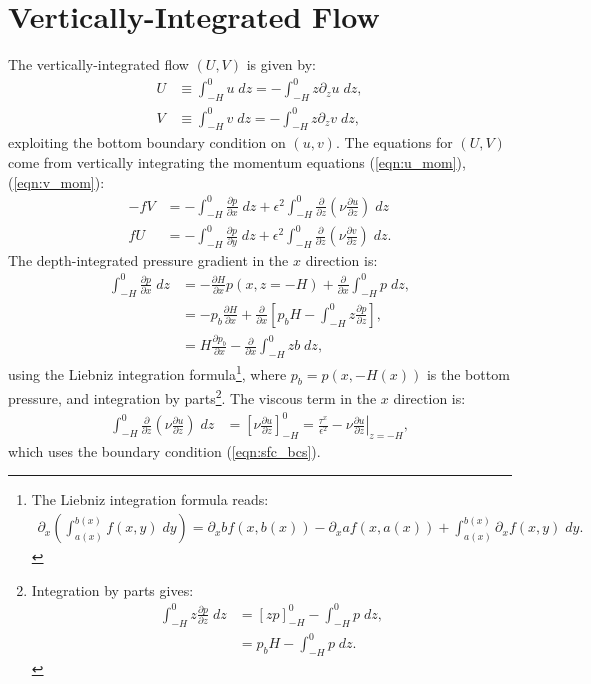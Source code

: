 \documentclass[10pt]{amsart}
\begin{document}
\section{Vertically-Integrated Flow}
The vertically-integrated flow $(U, V)$ is given by:
\begin{align}
U & \equiv \int_{-H}^{0} u \; dz = - \int_{-H}^0 z \partial_z u \; dz , \nonumber \\
V & \equiv \int_{-H}^{0} v \; dz = - \int_{-H}^0 z \partial_z v \; dz ,
\label{eqn:UV_defs}
\end{align}
exploiting the bottom boundary condition on $(u, v)$.
The equations for $(U, V)$ come from vertically integrating the momentum equations (\ref{eqn:u_mom}), (\ref{eqn:v_mom}):
\begin{align}
- f V & = -  \int_{-H}^{0} \frac{\partial p}{\partial x} \; dz + \epsilon^2   \int_{-H}^{0} \frac{\partial}{\partial z} \left( \nu \frac{\partial u}{\partial z} \right) \; dz \label{eqn:U_mom0} \\
f  U & = -  \int_{-H}^{0} \frac{\partial p}{\partial y} \; dz + \epsilon^2  \int_{-H}^{0} \frac{\partial}{\partial z} \left( \nu \frac{\partial v}{\partial z} \right) \; dz . \label{eqn:V_mom0}
\end{align}
The depth-integrated pressure gradient in the $x$ direction is:
\begin{align}
 \int_{-H}^{0} \frac{\partial p}{\partial x} \; dz & = - \frac{\partial H}{\partial x} p(x,z = -H) +  \frac{\partial }{\partial x} \int_{-H}^0 p \; dz , \\
 & = - p_b \frac{\partial H}{\partial x} + \frac{\partial }{\partial x} \left[ p_b H - \int_{-H}^0 z \frac{\partial p}{\partial z}  \right], \\
  & = H \frac{\partial p_b}{\partial x} - \frac{\partial }{\partial x} \int_{-H}^0 z b \; dz ,
 \end{align}
 using the Liebniz integration formula\footnote{The Liebniz integration formula reads:
 \begin{align}
 \partial_x \left( \int_{a(x)}^{b(x)} f(x,y) \; dy \right) = \partial_x b f(x,b(x)) - \partial_x a f(x,a(x)) +  \int_{a(x)}^{b(x)} \partial_x f(x, y) \; dy . \nonumber
 \end{align}
 }, where $p_b = p(x,-H(x))$ is the bottom pressure, and integration by parts\footnote{
 Integration by parts gives:
 \begin{align}
\int_{-H}^0 z \frac{\partial p}{\partial z} \; dz & = \left[ z p \right]_{-H}^0 -   \int_{-H}^0 p \; dz , \nonumber \\ 
& = p_b H -  \int_{-H}^0 p \; dz . \nonumber
 \end{align}
 }.
 The viscous term in the $x$ direction is:
 \begin{align}
  \int_{-H}^{0} \frac{\partial}{\partial z} \left( \nu \frac{\partial u}{\partial z} \right) \; dz & = \left[  \nu \frac{\partial u}{\partial z}  \right]_{-H}^{0}  = \frac{\tau^x}{ \epsilon^2}  - \left. \nu \frac{\partial u}{\partial z} \right|_{z = -H} ,
 \end{align}
which uses the boundary condition (\ref{eqn:sfc_bcs}).
  
\end{document}
